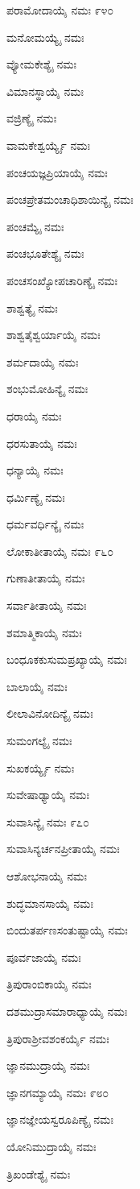 ಪರಾಮೋದಾಯೈ ನಮಃ \num{೯೪೦}

ಮನೋಮಯ್ಯೈ ನಮಃ 

ವ್ಯೋಮಕೇಶ್ಯೈ ನಮಃ

ವಿಮಾನಸ್ಥಾಯೈ ನಮಃ

ವಜ್ರಿಣ್ಯೈ ನಮಃ

ವಾಮಕೇಶ್ವರ್ಯ್ಯೈ ನಮಃ

ಪಂಚಯಜ್ಞಪ್ರಿಯಾಯೈ ನಮಃ

ಪಂಚಪ್ರೇತಮಂಚಾಧಿಶಾಯಿನ್ಯೈ ನಮಃ

ಪಂಚಮ್ಯೈ ನಮಃ

ಪಂಚಭೂತೇಶ್ಯೈ ನಮಃ

ಪಂಚಸಂಖ್ಯೋಪಚಾರಿಣ್ಯೈ ನಮಃ

ಶಾಶ್ವತ್ಯೈ ನಮಃ

ಶಾಶ್ವತೈಶ್ವರ್ಯಾಯೈ ನಮಃ

ಶರ್ಮದಾಯೈ ನಮಃ

ಶಂಭುಮೋಹಿನ್ಯೈ ನಮಃ

ಧರಾಯೈ ನಮಃ

ಧರಸುತಾಯೈ ನಮಃ

ಧನ್ಯಾಯೈ ನಮಃ

ಧರ್ಮಿಣ್ಯೈ ನಮಃ

ಧರ್ಮವರ್ಧಿನ್ಯೈ ನಮಃ 

ಲೋಕಾತೀತಾಯೈ ನಮಃ \num{೯೬೦}

ಗುಣಾತೀತಾಯೈ ನಮಃ

ಸರ್ವಾತೀತಾಯೈ ನಮಃ

ಶಮಾತ್ಮಿಕಾಯೈ ನಮಃ

ಬಂಧೂಕಕುಸುಮಪ್ರಖ್ಯಾಯೈ ನಮಃ

ಬಾಲಾಯೈ ನಮಃ

ಲೀಲಾವಿನೋದಿನ್ಯೈ ನಮಃ

ಸುಮಂಗಲ್ಯೈ ನಮಃ

ಸುಖಕರ್ಯ್ಯೈ ನಮಃ

ಸುವೇಷಾಢ್ಯಾಯೈ ನಮಃ

ಸುವಾಸಿನ್ಯೈ ನಮಃ \num{೯೭೦}

ಸುವಾಸಿನ್ಯರ್ಚನಪ್ರೀತಾಯೈ ನಮಃ

ಆಶೋಭನಾಯೈ ನಮಃ

ಶುದ್ಧಮಾನಸಾಯೈ ನಮಃ

ಬಿಂದುತರ್ಪಣಸಂತುಷ್ಟಾಯೈ ನಮಃ

ಪೂರ್ವಜಾಯೈ ನಮಃ

ತ್ರಿಪುರಾಂಬಿಕಾಯೈ ನಮಃ

ದಶಮುದ್ರಾಸಮಾರಾಧ್ಯಾಯೈ ನಮಃ

ತ್ರಿಪುರಾಶ್ರೀವಶಂಕರ್ಯೈ ನಮಃ

ಜ್ಞಾನಮುದ್ರಾಯೈ ನಮಃ 

ಜ್ಞಾನಗಮ್ಯಾಯೈ ನಮಃ \num{೯೮೦}

ಜ್ಞಾನಜ್ಞೇಯಸ್ವರೂಪಿಣ್ಯೈ ನಮಃ

ಯೋನಿಮುದ್ರಾಯೈ ನಮಃ

ತ್ರಿಖಂಡೇಶ್ಯೈ ನಮಃ

